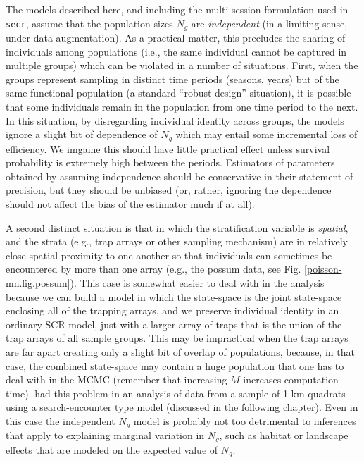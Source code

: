 The models described here, and including the multi-session formulation
used in \mbox{\tt secr}, assume that the population sizes $N_{g}$ are
{\it independent} (in a limiting sense, under data augmentation).  As
a practical matter, this precludes the sharing of individuals among
populations (i.e., the same individual cannot be captured in multiple
groups) which can be violated in a number of situations.  First, when
the groups represent sampling in distinct time periods (seasons,
years) but of the same functional population (a standard ``robust
design'' situation), it is possible that some individuals remain in
the population from one time period to the next.  In this situation,
by disregarding individual identity across groups, the models ignore a
slight bit of dependence of $N_{g}$ which may entail some incremental
loss of efficiency. We imgaine this should have little practical
effect unless survival probability is extremely high between the
periods.  Estimators of parameters obtained by assuming independence
should be conservative in their statement of precision, but they
should be unbiased (or, rather, ignoring the dependence should not
affect the bias of the estimator much if at all).

A second distinct situation is that in which the stratification
variable is {\it spatial}, and the strata (e.g., trap arrays or other
sampling mechanism) are in relatively close spatial proximity to one
another so that individuals can sometimes be encountered by more than
one array (e.g., the possum data, see
Fig. \ref{poisson-mn.fig.possum}). This case is somewhat easier to
deal with in the analysis because we can build a model in which the
state-space is the joint state-space enclosing all of the trapping
arrays, and we preserve individual identity in an ordinary SCR model,
just with a larger array of traps that is the union of the trap arrays
of all sample groups. This may be impractical when the trap arrays are
far apart creating only a slight bit of overlap of populations,
because, in that case, the combined state-space may contain a huge
population that one has to deal with in the MCMC (remember that
increasing $M$ increases computation time).
\citep{royle_etal:2011mee} had this problem in an analysis of data
from a sample of 1 km quadrats using a search-encounter type model
(discussed in the following chapter).  Even in this case the
independent $N_{g}$ model is probably not too detrimental to
inferences that apply to explaining marginal variation in $N_{g}$,
such as habitat or landscape effects that are modeled on the expected
value of $N_{g}$.









